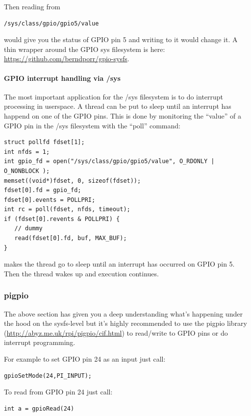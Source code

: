 \documentclass[12pt]{report}
\begin{document}
Then reading from
\begin{verbatim}
/sys/class/gpio/gpio5/value
\end{verbatim}
would give you the status of GPIO pin 5 and writing
to it would change it.
A thin wrapper around the GPIO sys filesystem is here: \url{https://github.com/berndporr/gpio-sysfs}.

\paragraph{GPIO interrupt handling via /sys}
The most important application for the /sys filesystem is to
do interrupt processing in userspace.
A thread can be put to sleep until an interrupt has happend on one of
the GPIO pins. This is done by monitoring the ``value''
of a GPIO pin in the /sys filesystem with the ``poll'' command:
\begin{verbatim}
struct pollfd fdset[1];
int nfds = 1;
int gpio_fd = open("/sys/class/gpio/gpio5/value", O_RDONLY | O_NONBLOCK );
memset((void*)fdset, 0, sizeof(fdset));
fdset[0].fd = gpio_fd;
fdset[0].events = POLLPRI;
int rc = poll(fdset, nfds, timeout);
if (fdset[0].revents & POLLPRI) {
   // dummy
   read(fdset[0].fd, buf, MAX_BUF);
}
\end{verbatim}
makes the thread go to sleep until an interrupt has occurred on
GPIO pin 5. Then the thread wakes up and execution continues.

\subsubsection{pigpio}
The above section has given you a deep understanding what's happening
under the hood on the sysfs-level but it's highly recommended to
use the pigpio library (\url{http://abyz.me.uk/rpi/pigpio/cif.html})
to read/write to GPIO pins or do interrupt programming.

For example to set GPIO pin 24 as an input just call:
\begin{verbatim}
gpioSetMode(24,PI_INPUT);
\end{verbatim}

To read from GPIO pin 24 just call:
\begin{verbatim}
int a = gpioRead(24)
\end{verbatim}
\end{document}
